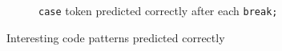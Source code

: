 \begin{figure}[t!]
\begin{subfigure}{\linewidth}
  \caption{{\tt case} token predicted correctly after each {\tt break;}}
  \label{fig:breakcase}
\end{subfigure}
  \caption{Interesting code patterns predicted correctly}
  \label{fig:moreexamples}
\end{figure}
